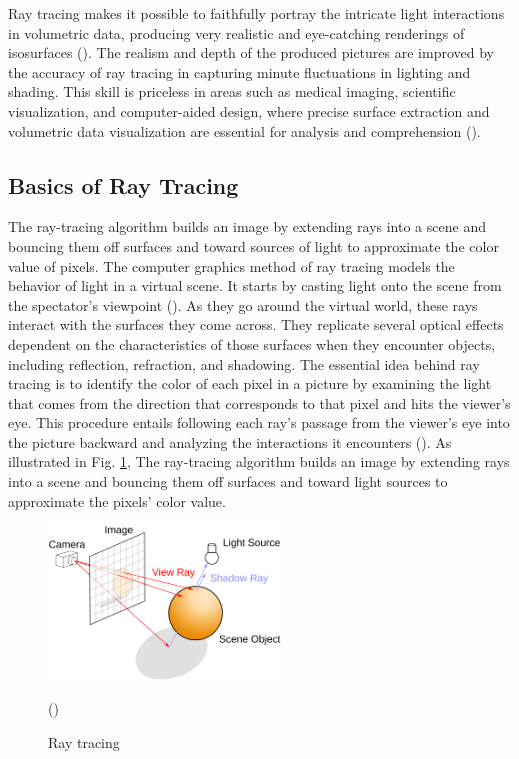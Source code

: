 Ray tracing makes it possible to faithfully portray the intricate light interactions in volumetric data, producing very realistic and eye-catching renderings of isosurfaces (\cite{Glassner_1989}). The realism and depth of the produced pictures are improved by the accuracy of ray tracing in capturing minute fluctuations in lighting and shading. This skill is priceless in areas such as medical imaging, scientific visualization, and computer-aided design, where precise surface extraction and volumetric data visualization are essential for analysis and comprehension (\cite{Parker_1999}).

\subsection{Basics of Ray Tracing} 
The ray-tracing algorithm builds an image by extending rays into a scene and bouncing them off surfaces and toward sources of light to approximate the color value of pixels.
The computer graphics method of ray tracing models the behavior of light in a virtual scene. It starts by casting light onto the scene from the spectator's viewpoint (\cite{Haines_Akenine_2019}). As they go around the virtual world, these rays interact with the surfaces they come across. They replicate several optical effects dependent on the characteristics of those surfaces when they encounter objects, including reflection, refraction, and shadowing. The essential idea behind ray tracing is to identify the color of each pixel in a picture by examining the light that comes from the direction that corresponds to that pixel and hits the viewer's eye. This procedure entails following each ray's passage from the viewer's eye into the picture backward and analyzing the interactions it encounters (\cite{Haines_Akenine_2019}). As illustrated in Fig. \ref{fig:ray_casting}, The ray-tracing algorithm builds an image by extending rays into a scene and bouncing them off surfaces and toward light sources to approximate the pixels' color value.

\begin{figure}
    \centering
    \includegraphics[height=0.4\textwidth,width=0.55\textwidth]{Figures/Ray_trace_diagram.png}
    \decoRule
    \caption{Ray tracing}(\cite{image_raytracingimage})
    \label{fig:ray_casting}
\end{figure}

